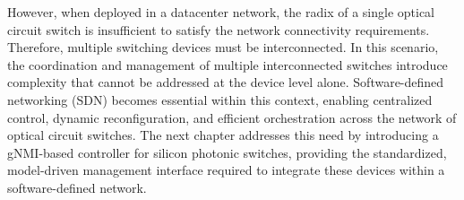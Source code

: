 However, when deployed in a datacenter network, the radix of a single optical circuit switch is insufficient to satisfy the network connectivity requirements.
Therefore, multiple switching devices must be interconnected.
In this scenario, the coordination and management of multiple interconnected switches introduce complexity that cannot be addressed at the device level alone.
Software-defined networking (SDN) becomes essential within this context, enabling centralized control, dynamic reconfiguration, and efficient orchestration across the network of optical circuit switches.
The next chapter addresses this need by introducing a gNMI-based controller for silicon photonic switches, providing the standardized, model-driven management interface required to integrate these devices within a software-defined network.